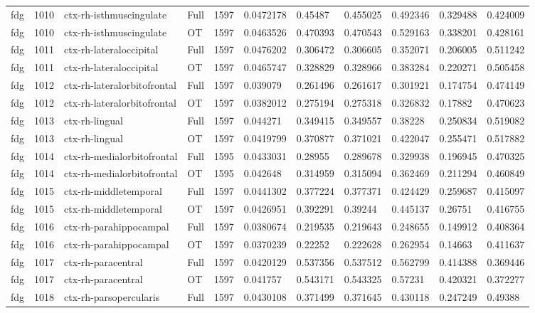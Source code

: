 \begin{landscape}
\begin{longtable}{lllllllllll}
fdg & 1010 & ctx-rh-isthmuscingulate & Full & 1597 & 0.0472178 & 0.45487 & 0.455025 & 0.492346 & 0.329488 & 0.424009 \\
fdg & 1010 & ctx-rh-isthmuscingulate & OT & 1597 & 0.0463526 & 0.470393 & 0.470543 & 0.529163 & 0.338201 & 0.428161 \\
fdg & 1011 & ctx-rh-lateraloccipital & Full & 1597 & 0.0476202 & 0.306472 & 0.306605 & 0.352071 & 0.206005 & 0.511242 \\
fdg & 1011 & ctx-rh-lateraloccipital & OT & 1597 & 0.0465747 & 0.328829 & 0.328966 & 0.383284 & 0.220271 & 0.505458 \\
fdg & 1012 & ctx-rh-lateralorbitofrontal & Full & 1597 & 0.039079 & 0.261496 & 0.261617 & 0.301921 & 0.174754 & 0.474149 \\
fdg & 1012 & ctx-rh-lateralorbitofrontal & OT & 1597 & 0.0382012 & 0.275194 & 0.275318 & 0.326832 & 0.17882 & 0.470623 \\
fdg & 1013 & ctx-rh-lingual & Full & 1597 & 0.044271 & 0.349415 & 0.349557 & 0.38228 & 0.250834 & 0.519082 \\
fdg & 1013 & ctx-rh-lingual & OT & 1597 & 0.0419799 & 0.370877 & 0.371021 & 0.422047 & 0.255471 & 0.517882 \\
fdg & 1014 & ctx-rh-medialorbitofrontal & Full & 1595 & 0.0433031 & 0.28955 & 0.289678 & 0.329938 & 0.196945 & 0.470325 \\
fdg & 1014 & ctx-rh-medialorbitofrontal & OT & 1595 & 0.042648 & 0.314959 & 0.315094 & 0.362469 & 0.211294 & 0.460849 \\
fdg & 1015 & ctx-rh-middletemporal & Full & 1597 & 0.0441302 & 0.377224 & 0.377371 & 0.424429 & 0.259687 & 0.415097 \\
fdg & 1015 & ctx-rh-middletemporal & OT & 1597 & 0.0426951 & 0.392291 & 0.39244 & 0.445137 & 0.26751 & 0.416755 \\
fdg & 1016 & ctx-rh-parahippocampal & Full & 1597 & 0.0380674 & 0.219535 & 0.219643 & 0.248655 & 0.149912 & 0.408364 \\
fdg & 1016 & ctx-rh-parahippocampal & OT & 1597 & 0.0370239 & 0.22252 & 0.222628 & 0.262954 & 0.14663 & 0.411637 \\
fdg & 1017 & ctx-rh-paracentral & Full & 1597 & 0.0420129 & 0.537356 & 0.537512 & 0.562799 & 0.414388 & 0.369446 \\
fdg & 1017 & ctx-rh-paracentral & OT & 1597 & 0.041757 & 0.543171 & 0.543325 & 0.57231 & 0.420321 & 0.372277 \\
fdg & 1018 & ctx-rh-parsopercularis & Full & 1597 & 0.0430108 & 0.371499 & 0.371645 & 0.430118 & 0.247249 & 0.49388 \\

\end{longtable}
\end{landscape}
